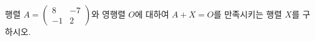 \hspace*{2mm}\begin{minipage}[t]{\dimexpr\linewidth-2mm\relax}\vspace{0pt}
행렬 $A=\begin{pmatrix} 8 & -7 \\ -1 & 2 \end{pmatrix}$와 영행렬 $O$에 대하여 $A+X=O$를 만족시키는 행렬 $X$를 구하시오.\end{minipage}
